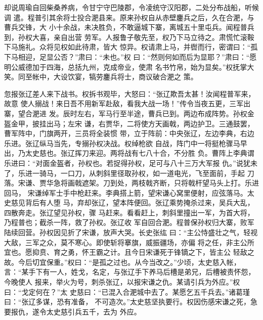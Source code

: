 却说周瑜自回柴桑养病，令甘宁守巴陵郡，令凌统守汉阳郡，二处分布战船，听候调
遣。程普引其余将士投合淝县来。原来孙权自从赤壁鏖兵之后，久在合淝，与曹兵交锋，大
小十余战，未决胜负，不敢逼城下寨，离城五十里屯兵。闻程普兵到，孙权大喜，亲自出营
劳军。人报鲁子敬先至，权乃下马立待之。肃慌忙滚鞍下马施礼。众将见权如此待肃，皆大
惊异。权请肃上马，并辔而行，密谓曰：“孤下马相迎，足显公否？”肃曰：“未也。”权
曰：“然则何如而后为显耶？”肃曰：“愿明公威德加于四海，总括九州，克成帝业，使肃
名书竹帛，始为显矣。”权抚掌大笑。同至帐中，大设饮宴，犒劳鏖兵将士，商议破合淝之
策。

忽报张辽差人来下战书。权拆书观毕，大怒曰：“张辽欺吾太甚！汝闻程普军来，故意
使人搦战！来日吾不用新军赴敌，看我大战一场！”传令当夜五更，三军出寨，望合淝进
发。辰时左右，军马行至半途，曹兵已到。两边布成阵势。孙权金盔金甲，披挂出马；左宋
谦，右贾华，二将使方天画戟，两边护卫。三通鼓罢，曹军阵中，门旗两开，三员将全装惯
带，立于阵前：中央张辽，左边李典，右边乐进。张辽纵马当先，专搦孙权决战。权绰枪欲
自战，阵门中一将挺枪骤马早出，乃太史慈也。张辽挥刀来迎。两将战有七八十合，不分胜
负。曹阵上李典谓乐进曰：“对面金盔者，孙权也。若捉得孙权，足可与八十三万大军报
仇。”说犹未了，乐进一骑马，一口刀，从刺斜里径取孙权，如一道电光，飞至面前，手起
刀落。宋谦、贾华急将画戟遮架。刀到处，两枝戟齐断，只将戟杆望马头上打。乐进回马，
宋谦绰军士手中枪赶来。李典搭上箭，望宋谦心窝里便射，应弦落马。太史慈见背后有人堕
马，弃却张辽，望本阵便回。张辽乘势掩杀过来，吴兵大乱，四散奔走。张辽望见孙权，骤
马赶来。看看赶上，刺斜里撞出一军，为首大将，乃程普也；截杀一阵，救了孙权。张辽收
军自回合淝。程普保孙权归大寨，败军陆续回营。孙权因见折了宋谦，放声大哭。长史张纮
曰：“主公恃盛壮之气，轻视大敌，三军之众，莫不寒心。即使斩将搴旗，威振疆场，亦偏
将之任，非主公所宜也。愿抑贲、育之勇，怀王霸之计。且今日宋谦死于锋镝之下，皆主公
轻敌之故。今后切宜保重。”权曰：“是孤之过也。从今当改之。”少顷，太史慈入帐，
言：“某手下有一人，姓戈，名定，与张辽手下养马后槽是弟兄，后槽被责怀怨，今晚使人
报来，举火为号，刺杀张辽，以报宋谦之仇。某请引兵为外应。”权曰：“戈定何在？”太
史慈曰：“已混入合淝城中去了。某愿乞五千兵去。”诸葛瑾曰：“张辽多谋，恐有准备，
不可造次。”太史慈坚执要行。权因伤感宋谦之死，急要报仇，遂令太史慈引兵五千，去为
外应。

